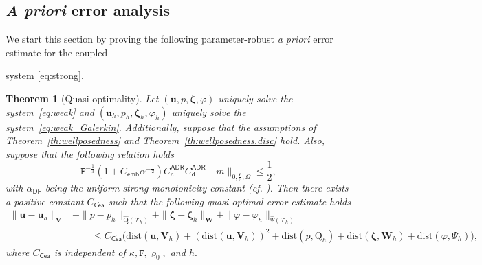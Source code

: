 \documentclass[11pt, reqno, a4paper, twoside]{article}
\newcommand{\bu}{\boldsymbol{u}}
\newcommand\bzeta{\boldsymbol{\zeta}}
\newcommand{\rF}{\mathtt{F}}
\newcommand{\rQ}{\mathrm{Q}}
\newcommand{\bW}{\mathbf{W}}
\newcommand{\bV}{\mathbf{V}}
\newcommand{\cT}{\mathcal{T}}
\newtheorem{theorem}{Theorem}[section]
\numberwithin{equation}{section}
\numberwithin{remark}{section}
\numberwithin{figure}{section}
\numberwithin{table}{section}
\begin{document}
\subsection{ {\it{A priori}} error analysis}\label{sec:apriori}
We start this section by proving the following parameter-robust \textit{a priori} error estimate for the coupled {system \eqref{eq:strong}. %
\begin{theorem}[Quasi-optimality]\label{th:Cea}
    Let \((\bu,p,\bzeta,\varphi)\) uniquely solve the system~\eqref{eq:weak} and \((\bu_h,p_h,\bzeta_h,\varphi_h)\) uniquely solve the system~\eqref{eq:weak_Galerkin}. Additionally, suppose that the assumptions of Theorem~\ref{th:wellposedness} and Theorem~\ref{th:wellposedness.disc} hold. Also, suppose that the following relation holds
    \[
       \rF^{-\frac13}(1+C_{\mathsf{emb}}\alpha^{-\frac12})C_c^{\mathsf{ADR}}C_{\mathsf{d}}^{\mathsf{ADR}}\|m\|_{0,\frac65,\Omega}\leq\frac12,
    \]
     with \(\alpha_{\mathsf{DF}}\) being the uniform strong monotonicity constant (cf. \cite[Equation~(4.9)]{dhpr_sinum26}). 
    Then there exists a positive constant \(C_{\mathsf{C\acute{e}a}}\) such that the following quasi-optimal error estimate holds %
    \begin{align}\label{eq:Cea}
        \|\bu-\bu_h\|_{\bV}&+\|p-p_h\|_{\widehat{\rQ}(\cT_h)}+\|\bzeta-\bzeta_h\|_{\bW}+\|\varphi-\varphi_h\|_{\widehat{\Psi}(\cT_h)}\nonumber\\
        &\qquad \leq C_{\mathsf{C\acute{e}a}}\bigl(\mathrm{dist}(\bu,\bV_h)+{(\mathrm{dist}(\bu,\bV_h))^2}+\mathrm{dist}(p,\rQ_h)+\mathrm{dist}(\bzeta,\bW_h)+\mathrm{dist}(\varphi,\Psi_h) \bigr),
    \end{align}
    where \(C_{\mathsf{C\acute{e}a}}\) is independent of \(\kappa,\rF,\varrho_0,\) and \(h.\) 
\end{theorem}


}
\end{document}
